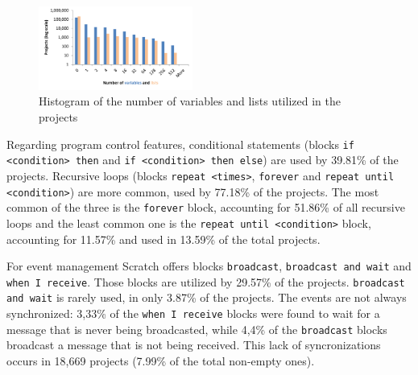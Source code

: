 \documentclass{sig-alternate}
\begin{document}
\begin{figure}
	\centering
	\includegraphics[width=0.45\textwidth]{fig/charts/8variableslists}
	\caption{Histogram of the number of variables and lists utilized in the projects}
	\label{fig:variables}
\end{figure}

Regarding program control features, conditional statements (blocks \texttt{if <condition> then} and \texttt{if <condition> then else}) are used by 39.81\% of the projects. Recursive loops (blocks \texttt{repeat <times>}, \texttt{forever} and \texttt{repeat until <condition>}) are more common, used by 77.18\% of the projects. The most common of the three is the \texttt{forever} block, accounting for 51.86\% of all recursive loops and the least common one is the \texttt{repeat until <condition>} block, accounting for 11.57\% and used in 13.59\% of the total projects.
	
For event management Scratch offers blocks \texttt{broadcast}, \texttt{broadcast and wait} and \texttt{when I receive}. 
Those blocks are utilized by 29.57\% of the projects. \texttt{broadcast and wait} is rarely used, in only 3.87\% of the projects. The events are not always synchronized: 3,33\% of the \texttt{when I receive} blocks were found to wait for a message that is never being broadcasted, while 4,4\% of the \texttt{broadcast} blocks broadcast a message that is not being received. This lack of syncronizations occurs in 18,669 projects (7.99\% of the total non-empty ones).

\noindent
{}
\end{document}
